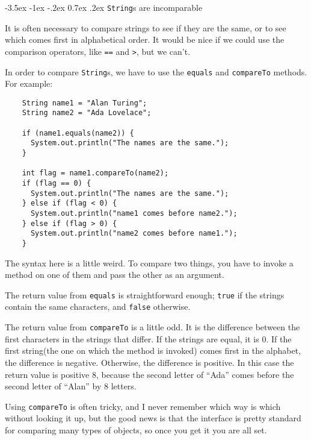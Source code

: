 \documentclass{book}
\makeatletter
\renewcommand{\section}{\@startsection 
    {section} {1} {0mm}%
    {-3.5ex \@plus -1ex \@minus -.2ex}%
    {0.7ex \@plus.2ex}%
    {\normalfont\Large\bfseries}}
\makeatother
\begin{document}

\section{{\tt String}s are incomparable}
\label{incomparable}

It is often necessary to compare strings to see if they are the same,
or to see which comes first in alphabetical order.  It would be
nice if we could use the comparison operators, like {\tt ==} and
{\tt >}, but we can't.

In order to compare {\tt String}s, we have to use the {\tt equals}
and {\tt compareTo} methods.  For example:

\begin{verbatim}
    String name1 = "Alan Turing";
    String name2 = "Ada Lovelace";

    if (name1.equals(name2)) {
      System.out.println("The names are the same.");
    }

    int flag = name1.compareTo(name2);
    if (flag == 0) {
      System.out.println("The names are the same.");
    } else if (flag < 0) {
      System.out.println("name1 comes before name2.");
    } else if (flag > 0) {
      System.out.println("name2 comes before name1.");
    }
\end{verbatim}
%
The syntax here is a little weird.  To compare two things, you
have to invoke a method on one of them and pass the other
as an argument.

The return value from {\tt equals} is straightforward enough;
{\tt true} if the strings contain the same characters, and
{\tt false} otherwise.

The return value from {\tt compareTo} is a little odd.  It is
the difference between the first characters in the strings
that differ.  If the strings are equal, it is 0.  If the
first string(the one on which the method is invoked) comes
first in the alphabet, the difference is negative.  Otherwise,
the difference is positive.  In this case the return value
is positive 8, because the second letter of ``Ada'' comes
before the second letter of ``Alan'' by 8 letters.

Using {\tt compareTo} is often tricky, and I never remember
which way is which without looking it up, but the good news
is that the interface is pretty standard for comparing many
types of objects, so once you get it you are all set.
\end{document}

